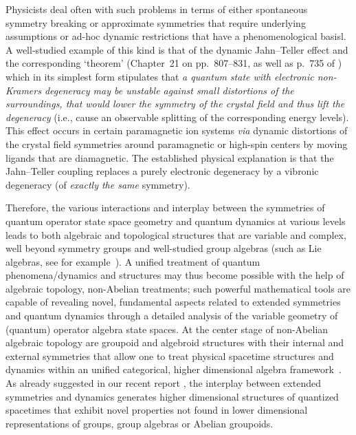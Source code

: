 \documentclass[12pt]{article}
\theoremstyle{plain}
\theoremstyle{definition}
\numberwithin{equation}{section}
\begin{document}
Physicists deal often with such problems in terms of either spontaneous symmetry breaking or approximate symmetries that require underlying assumptions or ad-hoc dynamic restrictions that have a phenomenological basisl. A well-studied example of this kind is that of the dynamic Jahn--Teller effect and the corresponding `theorem' (Chapter~21 on pp.~807--831, as well as p.~735 of \cite{Abragam-Bleaney70}) which in its simplest form stipulates that {\em a quantum state with electronic non-Kramers degeneracy may be unstable against small distortions of the surroundings, that would lower the symmetry of the crystal field and thus lift the degeneracy} (i.e., cause an observable splitting of the corresponding energy levels). This effect occurs in certain paramagnetic ion systems {\em via} dynamic distortions of the crystal field symmetries around paramagnetic or high-spin centers by moving ligands that are diamagnetic. The established physical explanation is that the Jahn--Teller coupling replaces a purely electronic degeneracy by a vibronic degeneracy (of {\em exactly the same} symmetry).  

Therefore, the various interactions and interplay between the symmetries of quantum operator state space geometry and quantum dynamics at various levels leads to both algebraic and topological structures that are variable and complex, well beyond  symmetry groups and well-studied group algebras (such as Lie algebras, see for example~\cite{Gilmore2k5}). A unified treatment of quantum phenomena/dynamics and structures may thus become possible with the help of algebraic topology, non-Abelian treatments; such powerful mathematical tools are capable of revealing novel, fundamental aspects related to extended symmetries and quantum dynamics through
a detailed analysis of the variable geometry of (quantum) operator algebra state spaces. At the center stage of non-Abelian algebraic
topology are groupoid and algebroid structures with their internal and external symmetries \cite{Weinstein96} that allow one to treat
physical spacetime structures and dynamics within an unified categorical, higher dimensional algebra frame\-work~\cite{Brown-etal2k7}.
As already suggested in our recent report \cite{BGB1}, the interplay between extended symmetries and dynamics generates higher dimensional structures of
quantized spacetimes that exhibit novel properties not found in lower dimensional representations of groups, group algebras or Abelian groupoids.
\end{document}
